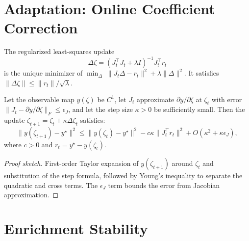 \section{Adaptation: Online Coefficient Correction}
\label{app:adapt}

\begin{lemma}
\label{app:lem:tikhonov}
The regularized least-squares update
\[
  \Delta\zeta
  = (J_t^\top J_t + \lambda I)^{-1}J_t^\top r_t
\]
is the unique minimizer of
$\min_{\Delta}\;\|J_t\Delta - r_t\|^2 + \lambda\|\Delta\|^2$.
It satisfies $\|\Delta\zeta\|\leq \|r_t\|/\sqrt{\lambda}$.
\end{lemma}

\begin{theorem}
\label{app:thm:residual_decrease}
Let the observable map $y(\zeta)$ be $C^1$, let $J_t$ approximate
$\partial y/\partial\zeta$ at $\zeta_t$ with error
$\|J_t - \partial y/\partial\zeta\|_F\leq\epsilon_J$, and let the
step size $\kappa>0$ be sufficiently small.
Then the update $\zeta_{t+1} = \zeta_t + \kappa\Delta\zeta_t$ satisfies:
\[
  \|y(\zeta_{t+1}) - y^\star\|^2
  \leq \|y(\zeta_t) - y^\star\|^2
       - c\kappa\|J_t^\top r_t\|^2
       + O(\kappa^2 + \kappa\epsilon_J),
\]
where $c>0$ and $r_t = y^\star - y(\zeta_t)$.
\end{theorem}

\begin{proof}[Proof sketch]
First-order Taylor expansion of $y(\zeta_{t+1})$ around $\zeta_t$
and substitution of the step formula, followed by Young's inequality
to separate the quadratic and cross terms.
The $\epsilon_J$ term bounds the error from Jacobian approximation.
\end{proof}

\section{Enrichment Stability}
\label{app:enrich}

